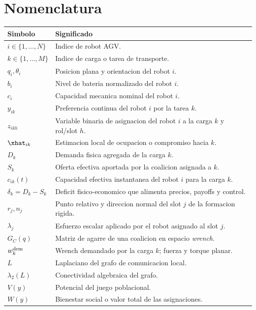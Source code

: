 \section*{Nomenclatura}

\begin{tabularx}{\textwidth}{@{}lX@{}}
\toprule
Simbolo & Significado \\
\midrule
$i \in \{1,\dots,N\}$ & Indice de robot AGV. \\
$k \in \{1,\dots,M\}$ & Indice de carga o tarea de transporte. \\
$q_i, \theta_i$ & Posicion plana y orientacion del robot $i$. \\
$b_i$ & Nivel de bateria normalizado del robot $i$. \\
$c_i$ & Capacidad mecanica nominal del robot $i$. \\
$y_{ik}$ & Preferencia continua del robot $i$ por la tarea $k$. \\
$z_{ikh}$ & Variable binaria de asignacion del robot $i$ a la carga $k$ y rol/slot $h$. \\
$\xhat_{ik}$ & Estimacion local de ocupacion o compromiso hacia $k$. \\
$D_k$ & Demanda fisica agregada de la carga $k$. \\
$S_k$ & Oferta efectiva aportada por la coalicion asignada a $k$. \\
$c_{ik}(t)$ & Capacidad efectiva instantanea del robot $i$ para la carga $k$. \\
$\delta_k = D_k-S_k$ & Deficit fisico-economico que alimenta precios, payoffs y control. \\
$r_j, n_j$ & Punto relativo y direccion normal del slot $j$ de la formacion rigida. \\
$\lambda_j$ & Esfuerzo escalar aplicado por el robot asignado al slot $j$. \\
$G_C(q)$ & Matriz de agarre de una coalicion en espacio \emph{wrench}. \\
$w_k^{\rm dem}$ & Wrench demandado por la carga $k$; fuerza y torque planar. \\
$L$ & Laplaciano del grafo de comunicacion local. \\
$\lambda_2(L)$ & Conectividad algebraica del grafo. \\
$V(y)$ & Potencial del juego poblacional. \\
$W(y)$ & Bienestar social o valor total de las asignaciones. \\
\bottomrule
\end{tabularx}
